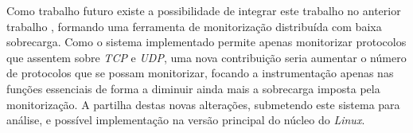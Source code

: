 \documentclass[a4paper]{llncs}
\begin{document}
Como trabalho futuro existe a possibilidade de integrar este trabalho no anterior trabalho \cite{Farruca:2009,duarte10}, formando uma ferramenta de monitorização distribuída com baixa sobrecarga. Como o sistema implementado permite apenas monitorizar protocolos que assentem sobre \textit{TCP} e \textit{UDP}, uma nova contribuição seria aumentar o número de protocolos que se possam monitorizar, focando a instrumentação apenas nas funções essenciais de forma a diminuir ainda mais a sobrecarga imposta pela monitorização. A partilha destas novas alterações, submetendo este sistema para análise, e possível implementação na versão principal do núcleo do \textit{Linux}.   




\end{document}
